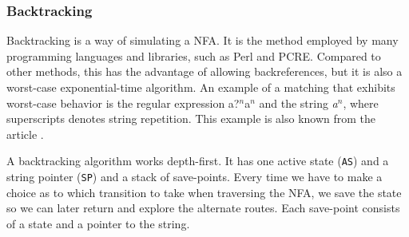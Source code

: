 \subsubsection{Backtracking}
Backtracking is a way of simulating a NFA. It is the method employed
by many programming languages and libraries, such as Perl and
PCRE. Compared to other methods, this has the advantage of allowing
backreferences, but it is also a worst-case exponential-time
algorithm. An example of a matching that exhibits worst-case behavior
is the regular expression \textsf{a?$^n$a$^n$} and the string
\textsl{a$^n$}, where superscripts denotes string repetition. This
example is also known from the article \cite{RussCox}.

A backtracking algorithm works depth-first. It has one active state
(\texttt{AS}) and a string pointer (\texttt{SP}) and a stack of
save-points. Every time we have to make a choice as to which
transition to take when traversing the NFA, we save the state so we
can later return and explore the alternate routes. Each save-point
consists of a state and a pointer to the string.

